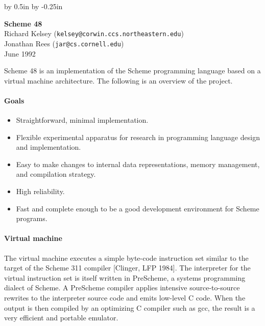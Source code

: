 
\pagestyle{empty}
\setlength{\textheight}{9in}
\setlength{\footheight}{0.0in}
\setlength{\topmargin}{0in}


\advance\textwidth by 0.5in
\advance\oddsidemargin by -0.25in




\vspace*{-0.3in}

\begin{center}
{\large\bf Scheme 48} \\
\vspace{1ex}
Richard Kelsey ({\tt kelsey@corwin.ccs.northeastern.edu}) \\
Jonathan Rees ({\tt jar@cs.cornell.edu}) \\
June 1992
\end{center}

\vspace{1ex}

Scheme 48 is an implementation of the Scheme programming language based
on a virtual machine architecture.  The following is an overview of
the project.

\paragraph{Goals}

\begin{itemize}
\setlength{\itemsep}{0pt}
\item Straightforward, minimal implementation.
\item Flexible experimental apparatus for research in programming
      language design and implementation.
\item Easy to make changes to internal data representations, memory
      management, and compilation strategy.
\item High reliability.
\item Fast and complete enough to be a good
      development environment for Scheme programs.
\end{itemize}


\paragraph{Virtual machine}

The virtual machine executes a simple byte-code instruction set
similar to the target of the Scheme 311 compiler [Clinger, LFP 1984].
The interpreter for the virtual instruction set is itself written in
PreScheme, a systems programming dialect of Scheme.  A PreScheme
compiler applies intensive source-to-source rewrites to the
interpreter source code and emits low-level C code.  When the output
is then compiled by an optimizing C compiler such as gcc, the result
is a very efficient and portable emulator.

